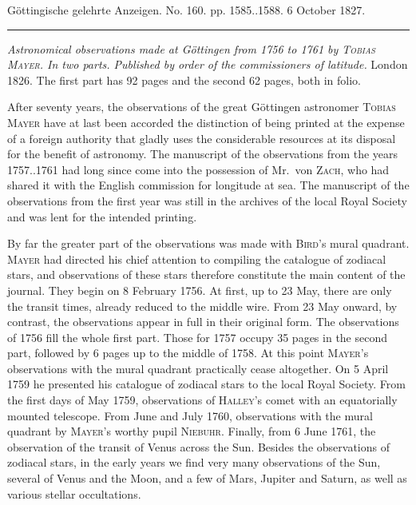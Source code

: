 \clearpage
{}
\hypertarget{native-649-lower}{}
\begin{center}\small Göttingische gelehrte Anzeigen. No. 160. pp. 1585..1588. 6 October 1827.\\[3pt]\rule{.72\linewidth}{.3pt}\end{center}

\emph{Astronomical observations made at Göttingen from \textup{1756} to \textup{1761} by \textup{\textsc{Tobias Mayer}}. In two parts. Published by order of the commissioners of latitude.} London 1826. The first part has 92 pages and the second 62 pages, both in folio.

After seventy years, the observations of the great Göttingen astronomer \textsc{Tobias Mayer} have at last been accorded the distinction of being printed at the expense of a foreign authority that gladly uses the considerable resources at its disposal for the benefit of astronomy. The manuscript of the observations from the years 1757..1761 had long since come into the possession of Mr.~von \textsc{Zach}, who had shared it with the English commission for longitude at sea. The manuscript of the observations from the first year was still in the archives of the local Royal Society and was lent for the intended printing.

By far the greater part of the observations was made with \textsc{Bird}'s mural quadrant. \textsc{Mayer} had directed his chief attention to compiling the catalogue of zodiacal stars, and observations of these stars therefore constitute the main content of the journal. They begin on 8 February 1756. At first, up to 23 May, there are only the transit times, already reduced to the middle wire. From 23 May onward, by contrast, the observations appear in full in their original form. The observations of 1756 fill the whole first part. Those for 1757 occupy 35 pages in the second part, followed by 6 pages up to the middle of 1758. At this point \textsc{Mayer}'s observations with the mural quadrant practically cease altogether. On 5 April 1759 he presented his catalogue of zodiacal stars to the local Royal Society. From the first days of May 1759, observations of \textsc{Halley}'s comet with an equatorially mounted telescope. From June and July 1760, observations with the mural quadrant by \textsc{Mayer}'s worthy pupil \textsc{Niebuhr}. Finally, from 6 June 1761, the observation of the transit of Venus across the Sun. Besides the observations of zodiacal stars, in the early years we find very many observations of the Sun, several of Venus and the Moon, and a few of Mars, Jupiter and Saturn, as well as various stellar occultations.


